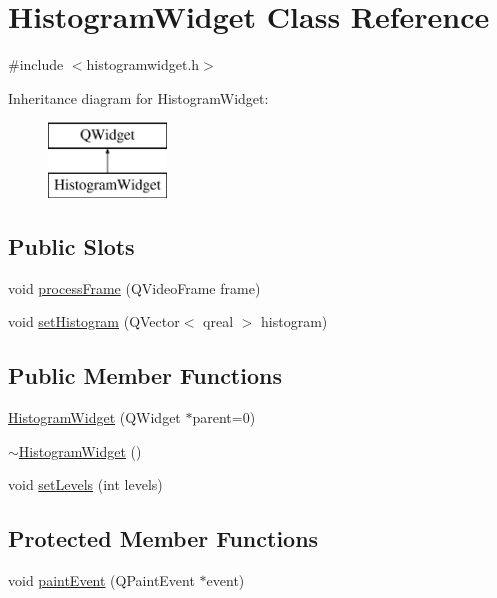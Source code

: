 \hypertarget{class_histogram_widget}{\section{Histogram\-Widget Class Reference}
\label{class_histogram_widget}
}


{\ttfamily \#include $<$histogramwidget.\-h$>$}

Inheritance diagram for Histogram\-Widget\-:\begin{figure}[H]
\begin{center}
\leavevmode
\includegraphics[height=2.000000cm]{class_histogram_widget}
\end{center}
\end{figure}
\subsection*{Public Slots}
\begin{DoxyCompactItemize}
\item 
void \hyperlink{class_histogram_widget_aa26da97b48ea2970194f6f95569ba2a3}{process\-Frame} (Q\-Video\-Frame frame)
\item 
void \hyperlink{class_histogram_widget_a5bc026f9bd9e56844701b76b3b5256c5}{set\-Histogram} (Q\-Vector$<$ qreal $>$ histogram)
\end{DoxyCompactItemize}
\subsection*{Public Member Functions}
\begin{DoxyCompactItemize}
\item 
\hyperlink{class_histogram_widget_a1616a35cf11de6ccc8eac64cd8e6b6c2}{Histogram\-Widget} (Q\-Widget $\ast$parent=0)
\item 
\hyperlink{class_histogram_widget_a76c7278ed776d108368d2a2dbaeab3d5}{$\sim$\-Histogram\-Widget} ()
\item 
void \hyperlink{class_histogram_widget_a1ff2b40125b70cabb71d0e54f17a7f2e}{set\-Levels} (int levels)
\end{DoxyCompactItemize}
\subsection*{Protected Member Functions}
\begin{DoxyCompactItemize}
\item 
void \hyperlink{class_histogram_widget_aed139a9d7a2ee8f388b67ecc2c0cfcd4}{paint\-Event} (Q\-Paint\-Event $\ast$event)
\end{DoxyCompactItemize}


